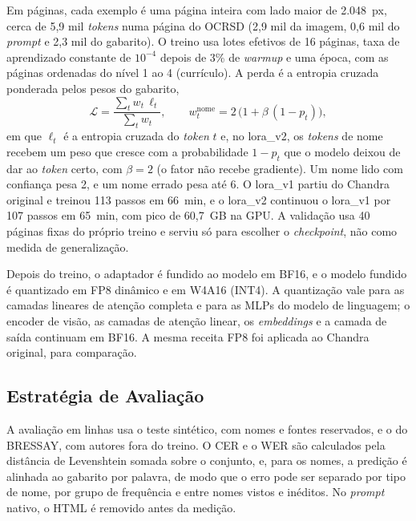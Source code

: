 \documentclass[12pt,a4paper]{article}
\begin{document}
Em páginas, cada exemplo é uma página inteira com lado maior de 2.048~px, cerca de 5,9 mil \emph{tokens} numa página do OCRSD (2,9 mil da imagem, 0,6 mil do \emph{prompt} e 2,3 mil do gabarito). O treino usa lotes efetivos de 16 páginas, taxa de aprendizado constante de $10^{-4}$ depois de 3\% de \emph{warmup} e uma época, com as páginas ordenadas do nível 1 ao 4 (currículo). A perda é a entropia cruzada ponderada pelos pesos do gabarito,
\[
\mathcal{L} = \frac{\sum_t w_t\, \ell_t}{\sum_t w_t}, \qquad
w_t^{\text{nome}} = 2\,\bigl(1 + \beta\,(1 - p_t)\bigr),
\]
em que $\ell_t$ é a entropia cruzada do \emph{token} $t$ e, no lora\_v2, os \emph{tokens} de nome recebem um peso que cresce com a probabilidade $1 - p_t$ que o modelo deixou de dar ao \emph{token} certo, com $\beta = 2$ (o fator não recebe gradiente). Um nome lido com confiança pesa 2, e um nome errado pesa até 6. O lora\_v1 partiu do Chandra original e treinou 113 passos em 66~min, e o lora\_v2 continuou o lora\_v1 por 107 passos em 65~min, com pico de 60,7~GB na GPU. A validação usa 40 páginas fixas do próprio treino e serviu só para escolher o \emph{checkpoint}, não como medida de generalização.

Depois do treino, o adaptador é fundido ao modelo em BF16, e o modelo fundido é quantizado em FP8 dinâmico e em W4A16 (INT4). A quantização vale para as camadas lineares de atenção completa e para as MLPs do modelo de linguagem; o encoder de visão, as camadas de atenção linear, os \emph{embeddings} e a camada de saída continuam em BF16. A mesma receita FP8 foi aplicada ao Chandra original, para comparação.

\subsection{Estratégia de Avaliação}
\label{subsec:aval}

A avaliação em linhas usa o teste sintético, com nomes e fontes reservados, e o do BRESSAY, com autores fora do treino. O CER e o WER são calculados pela distância de Levenshtein somada sobre o conjunto, e, para os nomes, a predição é alinhada ao gabarito por palavra, de modo que o erro pode ser separado por tipo de nome, por grupo de frequência e entre nomes vistos e inéditos. No \emph{prompt} nativo, o HTML é removido antes da medição.
\end{document}
